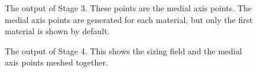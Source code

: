 \documentclass[fleqn,12pt,openany]{book}
\begin{document}
\begin{figure}
\begin{center}
\end{center}
\caption{\label{fig:tooth_stage2-2} The output of Stage 3. These points are the medial axis points. The medial axis points are generated for each material, but only the first material is shown by default.}
\end{figure} 


\begin{figure}
\begin{center}
\end{center}
\caption{\label{fig:tooth_stage3} The output of Stage 4. This shows the sizing field and the medial axis points meshed together.}
\end{figure} 
\end{document}
